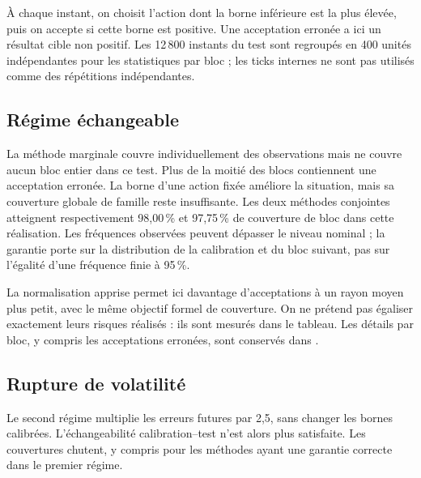 À chaque instant, on choisit l'action dont la borne inférieure est la plus élevée, puis on accepte si cette borne est positive. Une acceptation erronée a ici un résultat cible non positif. Les 12\,800 instants du test sont regroupés en 400 unités indépendantes pour les statistiques par bloc ; les ticks internes ne sont pas utilisés comme des répétitions indépendantes.

\subsection{Régime échangeable}

\begin{table}[H]\centering\small

\caption{Expérience 5, régime échangeable. Le rayon moyen est en pb. « Bloc erroné » désigne un bloc avec au moins une acceptation erronée, et non une proportion conditionnelle de pertes par transaction. Les acceptations sont comptées sur les 12\,800 occasions.}
\label{tab:ext-coverage-stable}
\end{table}

La méthode marginale couvre individuellement des observations mais ne couvre aucun bloc entier dans ce test. Plus de la moitié des blocs contiennent une acceptation erronée. La borne d'une action fixée améliore la situation, mais sa couverture globale de famille reste insuffisante. Les deux méthodes conjointes atteignent respectivement 98,00\,\% et 97,75\,\% de couverture de bloc dans cette réalisation. Les fréquences observées peuvent dépasser le niveau nominal ; la garantie porte sur la distribution de la calibration et du bloc suivant, pas sur l'égalité d'une fréquence finie à 95\,\%.

La normalisation apprise permet ici davantage d'acceptations à un rayon moyen plus petit, avec le même objectif formel de couverture. On ne prétend pas égaliser exactement leurs risques réalisés : ils sont mesurés dans le tableau. Les détails par bloc, y compris les acceptations erronées, sont conservés dans .

\subsection{Rupture de volatilité}

Le second régime multiplie les erreurs futures par 2,5, sans changer les bornes calibrées. L'échangeabilité calibration--test n'est alors plus satisfaite. Les couvertures chutent, y compris pour les méthodes ayant une garantie correcte dans le premier régime.

